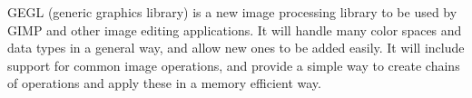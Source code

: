 GEGL (generic graphics library) is a new image processing library to be used by
GIMP and other image editing applications. It will handle many color spaces and
data types in a general way, and allow new ones to be added easily. It will
include support for common image operations, and provide a simple way to create
chains of operations and apply these in a memory efficient way.
